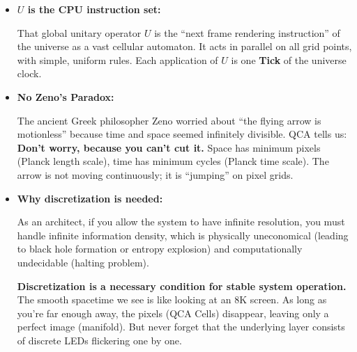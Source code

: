 \begin{itemize}
\item \textbf{$U$ is the CPU instruction set:}

    That global unitary operator \textbf{$U$} is the ``next frame rendering instruction'' of the universe as a vast cellular automaton. It acts in parallel on all grid points, with simple, uniform rules. Each application of \textbf{$U$} is one \textbf{Tick} of the universe clock.

\item \textbf{No Zeno's Paradox:}

    The ancient Greek philosopher Zeno worried about ``the flying arrow is motionless'' because time and space seemed infinitely divisible. QCA tells us: \textbf{Don't worry, because you can't cut it.} Space has minimum pixels (Planck length scale), time has minimum cycles (Planck time scale). The arrow is not moving continuously; it is ``jumping'' on pixel grids.

\item \textbf{Why discretization is needed:}

    As an architect, if you allow the system to have infinite resolution, you must handle infinite information density, which is physically uneconomical (leading to black hole formation or entropy explosion) and computationally undecidable (halting problem).

    \textbf{Discretization is a necessary condition for stable system operation.} The smooth spacetime we see is like looking at an 8K screen. As long as you're far enough away, the pixels (QCA Cells) disappear, leaving only a perfect image (manifold). But never forget that the underlying layer consists of discrete LEDs flickering one by one.
\end{itemize}

